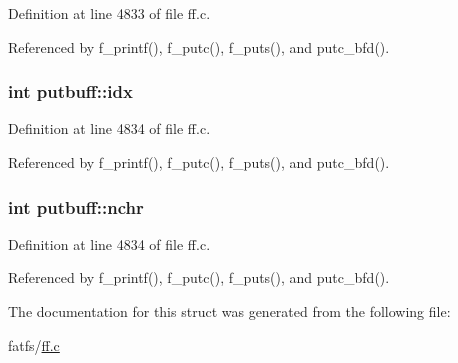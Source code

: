 Definition at line 4833 of file ff.\+c.



Referenced by f\+\_\+printf(), f\+\_\+putc(), f\+\_\+puts(), and putc\+\_\+bfd().

\subsubsection[{\texorpdfstring{idx}{idx}}]{\setlength{\rightskip}{0pt plus 5cm}int putbuff\+::idx}\hypertarget{structputbuff_a10a3ca93af8df07e9836ebd5230c06d8}{}\label{structputbuff_a10a3ca93af8df07e9836ebd5230c06d8}


Definition at line 4834 of file ff.\+c.



Referenced by f\+\_\+printf(), f\+\_\+putc(), f\+\_\+puts(), and putc\+\_\+bfd().

\subsubsection[{\texorpdfstring{nchr}{nchr}}]{\setlength{\rightskip}{0pt plus 5cm}int putbuff\+::nchr}\hypertarget{structputbuff_a125366bfe48077e6f562f95e30b4604a}{}\label{structputbuff_a125366bfe48077e6f562f95e30b4604a}


Definition at line 4834 of file ff.\+c.



Referenced by f\+\_\+printf(), f\+\_\+putc(), f\+\_\+puts(), and putc\+\_\+bfd().



The documentation for this struct was generated from the following file\+:\begin{DoxyCompactItemize}
\item 
fatfs/\hyperlink{ff_8c}{ff.\+c}\end{DoxyCompactItemize}
